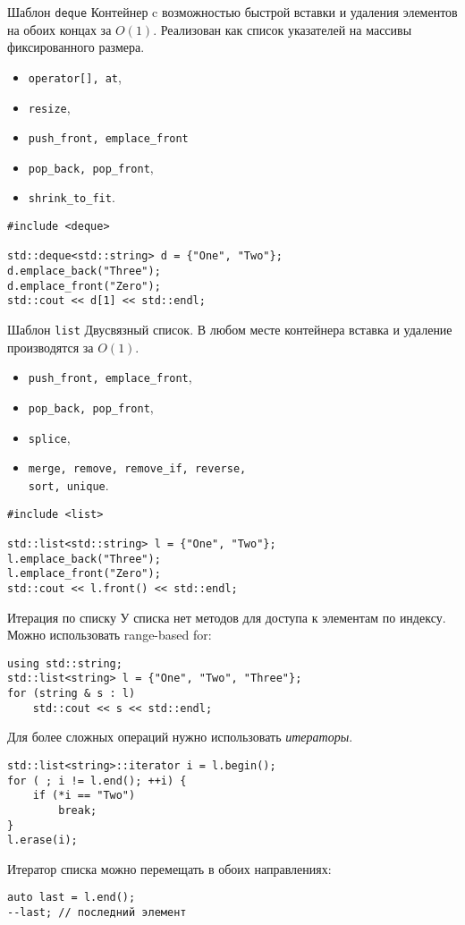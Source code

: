 \documentclass[aspectration=1610,t]{beamer}
\begin{document}
\begin{frame}[fragile]{Шаблон {\tt deque}}
Контейнер c возможностью быстрой вставки и удаления элементов на
обоих концах за $O(1)$. Реализован как список указателей на массивы
фиксированного размера.
\begin{itemize}
    \item {\tt operator[], at},
    \item {\tt resize},
    \item {\tt push\_front, emplace\_front}
    \item \texttt{pop\_back, pop\_front},
    \item \texttt{shrink\_to\_fit}.
\end{itemize}
\begin{lstlisting}
#include <deque>

std::deque<std::string> d = {"One", "Two"};
d.emplace_back("Three");
d.emplace_front("Zero");
std::cout << d[1] << std::endl;
\end{lstlisting}

\end{frame}

\begin{frame}[fragile]{Шаблон {\tt list}}
Двусвязный список. В любом месте контейнера 
вставка и удаление производятся за $O(1)$.
\begin{itemize}
    \item {\tt push\_front, emplace\_front},
    \item \texttt{pop\_back, pop\_front},
    \item \texttt{splice},
    \item {\tt merge, remove, remove\_if, reverse, \\sort, unique}.
\end{itemize}
\begin{lstlisting}
#include <list>

std::list<std::string> l = {"One", "Two"};
l.emplace_back("Three");
l.emplace_front("Zero");
std::cout << l.front() << std::endl;
\end{lstlisting}
\end{frame}

\begin{frame}[fragile]{Итерация по списку}
У списка нет методов для доступа к элементам по индексу.\\
Можно использовать range-based for:
\begin{lstlisting}
using std::string;
std::list<string> l = {"One", "Two", "Three"};
for (string & s : l)
    std::cout << s << std::endl;
\end{lstlisting}
Для более сложных операций нужно использовать \emph{итераторы}.
\begin{lstlisting}
std::list<string>::iterator i = l.begin();
for ( ; i != l.end(); ++i) {
    if (*i == "Two")
        break;
}
l.erase(i);
\end{lstlisting}

Итератор списка можно перемещать в обоих направлениях:
\begin{lstlisting}    
auto last = l.end();
--last; // последний элемент
\end{lstlisting}
\end{frame}
\end{document}
